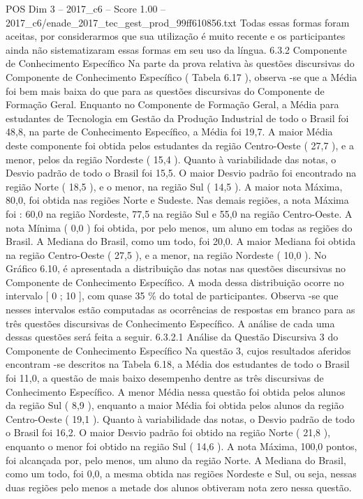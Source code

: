 \begin{textsample}{POS Dim 3 – 2017\_c6 – Score 1.00 – 2017\_c6/enade\_2017\_tec\_gest\_prod\_99ff610856.txt}
Todas essas formas foram aceitas, por considerarmos que sua utilização é muito recente e os participantes ainda não sistematizaram essas formas em seu uso da língua. 6.3.2 Componente de Conhecimento Específico Na parte da prova relativa às questões discursivas do Componente de Conhecimento Específico ( Tabela 6.17 ), observa -se que a Média foi bem mais baixa do que para as questões discursivas do Componente de Formação Geral.
Enquanto no Componente de Formação Geral, a Média para estudantes de Tecnologia em Gestão da Produção Industrial de todo o Brasil foi 48,8, na parte de Conhecimento Específico, a Média foi 19,7.
A maior Média deste componente foi obtida pelos estudantes da região Centro-Oeste ( 27,7 ), e a menor, pelos da região Nordeste ( 15,4 ).
Quanto à variabilidade das notas, o Desvio padrão de todo o Brasil foi 15,5.
O maior Desvio padrão foi encontrado na região Norte ( 18,5 ), e o menor, na região Sul ( 14,5 ).
A maior nota Máxima, 80,0, foi obtida nas regiões Norte e Sudeste.
Nas demais regiões, a nota Máxima foi : 60,0 na região Nordeste, 77,5 na região Sul e 55,0 na região Centro-Oeste.
A nota Mínima ( 0,0 ) foi obtida, por pelo menos, um aluno em todas as regiões do Brasil.
A Mediana do Brasil, como um todo, foi 20,0.
A maior Mediana foi obtida na região Centro-Oeste ( 27,5 ), e a menor, na região Nordeste ( 10,0 ).
No Gráfico 6.10, é apresentada a distribuição das notas nas questões discursivas no Componente de Conhecimento Específico.
A moda dessa distribuição ocorre no intervalo [ 0 ; 10 ], com quase 35 \% do total de participantes.
Observa -se que nesses intervalos estão computadas as ocorrências de respostas em branco para as três questões discursivas de Conhecimento Específico.
A análise de cada uma dessas questões será feita a seguir. 6.3.2.1 Análise da Questão Discursiva 3 do Componente de Conhecimento Específico Na questão 3, cujos resultados aferidos encontram -se descritos na Tabela 6.18, a Média dos estudantes de todo o Brasil foi 11,0, a questão de mais baixo desempenho dentre as três discursivas de Conhecimento Específico.
A menor Média nessa questão foi obtida pelos alunos da região Sul ( 8,9 ), enquanto a maior Média foi obtida pelos alunos da região Centro-Oeste ( 19,1 ).
Quanto à variabilidade das notas, o Desvio padrão de todo o Brasil foi 16,2.
O maior Desvio padrão foi obtido na região Norte ( 21,8 ), enquanto o menor foi obtido na região Sul ( 14,6 ).
A nota Máxima, 100,0 pontos, foi alcançada por, pelo menos, um aluno da região Norte.
A Mediana do Brasil, como um todo, foi 0,0, a mesma obtida nas regiões Nordeste e Sul, ou seja, nessas duas regiões pelo menos a metade dos alunos obtiveram nota zero nessa questão.

\end{textsample}
